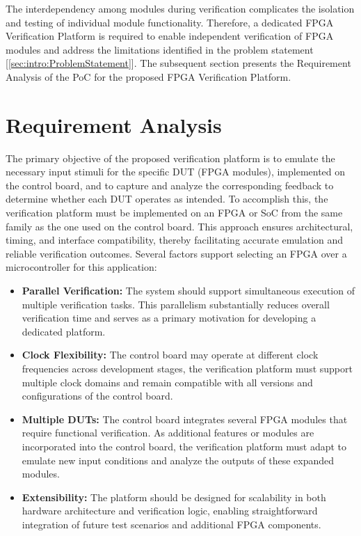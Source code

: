 	The interdependency among modules during verification complicates the isolation and testing of individual module functionality. Therefore, a dedicated \acs{FPGA} Verification Platform is required to enable independent verification of \acs{FPGA} modules and address the limitations identified in the problem statement [\ref{sec:intro:ProblemStatement}]. The subsequent section presents the Requirement Analysis of the \acs{PoC} for the proposed \acs{FPGA} Verification Platform.

\section{Requirement Analysis}
\label{sec:Concept:RequirementAnalysis}

The primary objective of the proposed verification platform is to emulate the necessary input stimuli for the specific \acs{DUT} (\acs{FPGA} modules), implemented on the control board, and to capture and analyze the corresponding feedback to determine whether each \acs{DUT} operates as intended. To accomplish this, the verification platform must be implemented on an \acs{FPGA} or \acs{SoC} from the same family as the one used on the control board. This approach ensures architectural, timing, and interface compatibility, thereby facilitating accurate emulation and reliable verification outcomes. Several factors support selecting an \acs{FPGA} over a microcontroller for this application:
\begin{itemize}
	\item \textbf{Parallel Verification:} The system should support simultaneous execution of multiple verification tasks. This parallelism substantially reduces overall verification time and serves as a primary motivation for developing a dedicated platform.
	\item \textbf{Clock Flexibility:} The control board may operate at different clock frequencies across development stages, the verification platform must support multiple clock domains and remain compatible with all versions and configurations of the control board.
	\item \textbf{Multiple DUTs:} The control board integrates several \acs{FPGA} modules that require functional verification. As additional features or modules are incorporated into the control board, the verification platform must adapt to emulate new input conditions and analyze the outputs of these expanded modules.
	\item \textbf{Extensibility:} The platform should be designed for scalability in both hardware architecture and verification logic, enabling straightforward integration of future test scenarios and additional \acs{FPGA} components.
\end{itemize}


